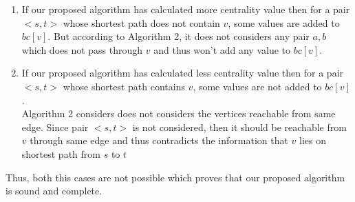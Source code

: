 \begin{enumerate}
\item If our proposed algorithm has calculated more centrality value then for a pair $<s,t>$ whose shortest path does not contain $v$, some values are added to $bc[v]$. But according to Algorithm 2, it does not considers any pair $a,b$ which does not pass through $v$ and thus won't add any value to $bc[v]$.
\item If our proposed algorithm has calculated less centrality value then for a pair $<s,t>$ whose shortest path contains $v$, some values are not added to $bc[v]$. 
\\
Algorithm 2 considers does not considers the vertices reachable from same edge. Since pair $<s,t>$ is not considered, then it should be reachable from $v$ through same edge and thus contradicts the information that $v$ lies on shortest path from $s$ to $t$
\end{enumerate}

Thus, both this cases are not possible which proves that our proposed algorithm is sound and complete.